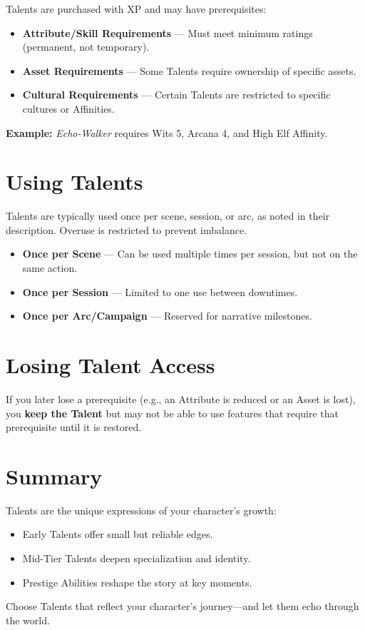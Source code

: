 Talents are purchased with XP and may have prerequisites:

\begin{itemize}
  \item \textbf{Attribute/Skill Requirements} — Must meet minimum ratings (permanent, not temporary).
  \item \textbf{Asset Requirements} — Some Talents require ownership of specific assets.
  \item \textbf{Cultural Requirements} — Certain Talents are restricted to specific cultures or Affinities.
\end{itemize}

\textbf{Example:} \textit{Echo-Walker} requires Wits 5, Arcana 4, and High Elf Affinity.

\section{Using Talents}

Talents are typically used once per scene, session, or arc, as noted in their description. Overuse is restricted to prevent imbalance.

\begin{itemize}
  \item \textbf{Once per Scene} — Can be used multiple times per session, but not on the same action.
  \item \textbf{Once per Session} — Limited to one use between downtimes.
  \item \textbf{Once per Arc/Campaign} — Reserved for narrative milestones.
\end{itemize}

\section{Losing Talent Access}

If you later lose a prerequisite (e.g., an Attribute is reduced or an Asset is lost), you \textbf{keep the Talent} but may not be able to use features that require that prerequisite until it is restored.

\section{Summary}

Talents are the unique expressions of your character’s growth:

\begin{itemize}
  \item Early Talents offer small but reliable edges.
  \item Mid-Tier Talents deepen specialization and identity.
  \item Prestige Abilities reshape the story at key moments.
\end{itemize}

Choose Talents that reflect your character’s journey—and let them echo through the world.

